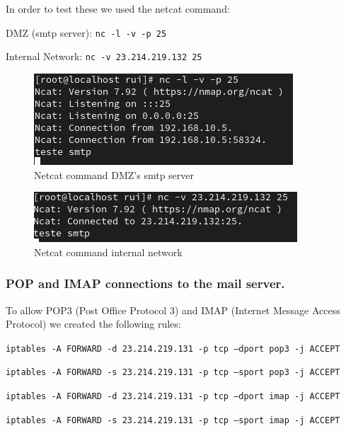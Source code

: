 \documentclass{article}
\begin{document}
In order to test these we used the netcat command:
\texttt{}\par
\texttt{}\par
DMZ (smtp server): \texttt{nc -l -v -p 25} \par
Internal Network: \texttt{nc -v 23.214.219.132 25} \par
\texttt{}\par
\begin{figure}[H]
    \centering
    \includegraphics[scale=0.5]{btw/btw_smtp_dmz.png}
    \caption{Netcat command DMZ's smtp server}
    \label{fig:network-arc}
\end{figure}

\begin{figure}[H]
    \centering
    \includegraphics[scale=0.5]{btw/btw_smtp_internal.png}
    \caption{Netcat command internal network}
    \label{fig:network-arc}
\end{figure}

\subsubsection{POP and IMAP connections to the mail server.}
\quad 
To allow POP3 (Post Office Protocol 3) and IMAP (Internet Message Access Protocol)  we created the following rules:

\texttt{}\par
\texttt{iptables -A FORWARD -d 23.214.219.131 -p tcp --dport pop3 -j ACCEPT}\par
\texttt{iptables -A FORWARD -s 23.214.219.131 -p tcp --sport pop3 -j ACCEPT}\par
\texttt{}\par
\texttt{}\par
\texttt{iptables -A FORWARD -d 23.214.219.131 -p tcp --dport imap -j ACCEPT}\par
\texttt{iptables -A FORWARD -s 23.214.219.131 -p tcp --sport imap -j ACCEPT}\par
\texttt{}\par
\end{document}
